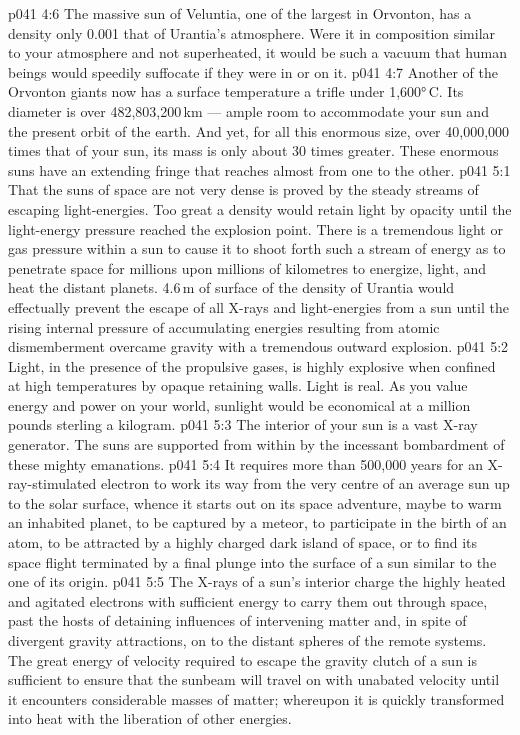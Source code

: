 \vs p041 4:6 The massive sun of Veluntia, one of the largest in Orvonton, has a density only 0.001 that of Urantia’s atmosphere. Were it in composition similar to your atmosphere and not superheated, it would be such a vacuum that human beings would speedily suffocate if they were in or on it.
\vs p041 4:7 Another of the Orvonton giants now has a surface temperature a trifle under 1,600°\,C. Its diameter is over 482,803,200\,km --- ample room to accommodate your sun and the present orbit of the earth. And yet, for all this enormous size, over 40,000,000 times that of your sun, its mass is only about 30 times greater. These enormous suns have an extending fringe that reaches almost from one to the other.
\vs p041 5:1 That the suns of space are not very dense is proved by the steady streams of escaping light\hyp{}energies. Too great a density would retain light by opacity until the light\hyp{}energy pressure reached the explosion point. There is a tremendous light or gas pressure within a sun to cause it to shoot forth such a stream of energy as to penetrate space for millions upon millions of kilometres to energize, light, and heat the distant planets. 4.6\,m of surface of the density of Urantia would effectually prevent the escape of all X\hyp{}rays and light\hyp{}energies from a sun until the rising internal pressure of accumulating energies resulting from atomic dismemberment overcame gravity with a tremendous outward explosion.
\vs p041 5:2 Light, in the presence of the propulsive gases, is highly explosive when confined at high temperatures by opaque retaining walls. Light is real. As you value energy and power on your world, sunlight would be economical at a million pounds sterling a kilogram.
\vs p041 5:3 The interior of your sun is a vast X\hyp{}ray generator. The suns are supported from within by the incessant bombardment of these mighty emanations.
\vs p041 5:4 It requires more than 500,000 years for an X\hyp{}ray\hyp{}stimulated electron to work its way from the very centre of an average sun up to the solar surface, whence it starts out on its space adventure, maybe to warm an inhabited planet, to be captured by a meteor, to participate in the birth of an atom, to be attracted by a highly charged dark island of space, or to find its space flight terminated by a final plunge into the surface of a sun similar to the one of its origin.
\vs p041 5:5 The X\hyp{}rays of a sun’s interior charge the highly heated and agitated electrons with sufficient energy to carry them out through space, past the hosts of detaining influences of intervening matter and, in spite of divergent gravity attractions, on to the distant spheres of the remote systems. The great energy of velocity required to escape the gravity clutch of a sun is sufficient to ensure that the sunbeam will travel on with unabated velocity until it encounters considerable masses of matter; whereupon it is quickly transformed into heat with the liberation of other energies.
